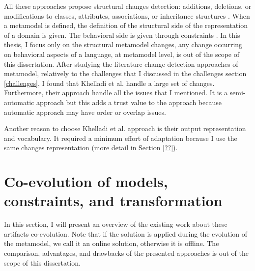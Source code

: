 All these approaches propose structural changes detection: additions, deletions, or modifications to classes, attributes, associations, or inheritance structures \cite{10.1007/s10270-013-0392-y}. When a metamodel is defined, the definition of the structural side of the representation of a domain is given. The behavioral side is given through constraints \cite{10.1007/s10515-009-0053-0}. In this thesis, I focus only on the structural metamodel changes, any change occurring on behavioral aspects of a language, at metamodel level, is out of the scope of this dissertation.
After studying the literature change detection approaches of metamodel, relatively to the challenges that I discussed in the challenges section \ref{challenges}, I found that Khelladi et al. \cite{khelladi2016detecting} handle a large set of changes. Furthermore, their approach handle all the issues that I mentioned. 
It is a semi-automatic approach but this adds a trust value to the approach because automatic approach may have order or overlap issues.

Another reason to choose Khelladi et al. \cite{khelladi2016detecting} approach is their output representation and vocabulary. It required a minimum effort of adaptation because I use the same changes representation (more detail in Section \ref{??}).


 \section{Co-evolution of models, constraints, and transformation}
 \label{coevolutionartifacts}
  In this section, I will present an overview of the existing work about these artifacts co-evolution. Note that if the solution is applied during the evolution of the metamodel, we call it an online solution, otherwise it is offline.
 The comparison, advantages, and drawbacks of the presented approaches is out of the scope of this dissertation.
 
